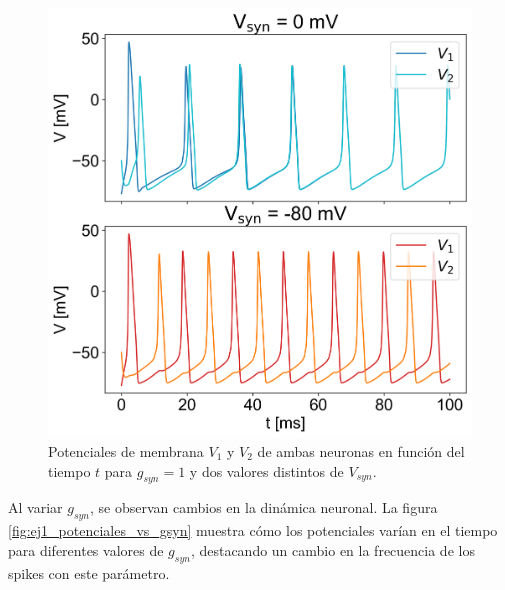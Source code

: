 \documentclass[aps,prb,twocolumn,superscriptaddress,floatfix,longbibliography]{revtex4-2}
\newcounter{para}
\begin{document}
\begin{figure}[h]
    \includegraphics[clip=true,width=\columnwidth]{ej1_potenciales_vs_Vsyn.png}
    \caption{Potenciales de membrana $V_1$ y $V_2$ de ambas neuronas en función del tiempo $t$ para $g_{syn} = 1$ y dos valores distintos de $V_{syn}$.}
     \label{fig:ej1_potenciales_vs_Vsyn}
\end{figure}

Al variar \(g_{syn}\), se observan cambios en la dinámica neuronal. La figura \ref{fig:ej1_potenciales_vs_gsyn} muestra cómo los potenciales varían en el tiempo para diferentes valores de \(g_{syn}\), destacando un cambio en la frecuencia de los spikes con este parámetro.
\end{document}
